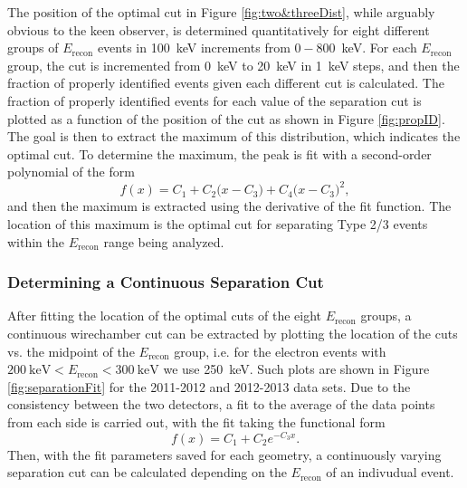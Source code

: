 The position of the optimal cut in Figure \ref{fig:two&threeDist}, while arguably obvious
to the keen observer, is determined quantitatively for eight different groups of $E_{\mathrm{recon}}$ events in
100~keV increments from $0-800$~keV. For each $E_{\mathrm{recon}}$ group,
the cut is incremented from 0~keV to 20~keV in 1~keV steps, and then the fraction
of properly identified events given each different cut is calculated. The fraction of properly identified events for
each value of the separation cut is plotted as a function of the position of the cut as shown
in Figure \ref{fig:propID}. The goal is then to extract the maximum of this distribution, which
indicates the optimal cut. To determine the maximum, the peak is fit with a second-order polynomial
of the form
%
\begin{equation}
  f(x) = C_1 + C_2\big(x-C_3\big) + C_4\big(x-C_3\big)^2,
\end{equation}
%
and then the maximum is extracted using the derivative of the fit function. The location
of this maximum is the optimal cut for separating Type 2/3 events within the $E_{\mathrm{recon}}$  
range being analyzed.



\subsubsection{Determining a Continuous Separation Cut}

After fitting the location of the optimal cuts of the eight $E_{\mathrm{recon}}$ groups, a
continuous wirechamber cut can be extracted by plotting the location of the cuts vs. the
midpoint of the $E_{\mathrm{recon}}$ group, i.e. for the electron events with
$200\mathrm{~keV}<E_{\mathrm{recon}}<300\mathrm{~keV}$ we use 250~keV. Such plots are shown in
Figure \ref{fig:separationFit} for the 2011-2012
and 2012-2013 data sets. Due to the consistency between the two detectors, a fit to the
average of the data points from each side is carried out, with the fit taking the
functional form 
%
\begin{equation}
  f(x) = C_1 + C_2e^{-C_3x}.
\end{equation}
Then, with the fit parameters saved for each geometry, a continuously varying separation
cut can be calculated depending on the $E_{\mathrm{recon}}$ of an indivudual event.

